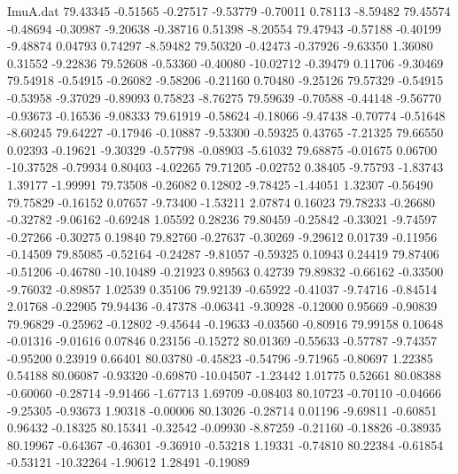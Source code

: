 \begin{filecontents}{ImuA.dat}
  79.43345   -0.51565   -0.27517   -9.53779   -0.70011    0.78113   -8.59482
  79.45574   -0.48694   -0.30987   -9.20638   -0.38716    0.51398   -8.20554
  79.47943   -0.57188   -0.40199   -9.48874    0.04793    0.74297   -8.59482
  79.50320   -0.42473   -0.37926   -9.63350    1.36080    0.31552   -9.22836
  79.52608   -0.53360   -0.40080  -10.02712   -0.39479    0.11706   -9.30469
  79.54918   -0.54915   -0.26082   -9.58206   -0.21160    0.70480   -9.25126
  79.57329   -0.54915   -0.53958   -9.37029   -0.89093    0.75823   -8.76275
  79.59639   -0.70588   -0.44148   -9.56770   -0.93673   -0.16536   -9.08333
  79.61919   -0.58624   -0.18066   -9.47438   -0.70774   -0.51648   -8.60245
  79.64227   -0.17946   -0.10887   -9.53300   -0.59325    0.43765   -7.21325
  79.66550    0.02393   -0.19621   -9.30329   -0.57798   -0.08903   -5.61032
  79.68875   -0.01675    0.06700  -10.37528   -0.79934    0.80403   -4.02265
  79.71205   -0.02752    0.38405   -9.75793   -1.83743    1.39177   -1.99991
  79.73508   -0.26082    0.12802   -9.78425   -1.44051    1.32307   -0.56490
  79.75829   -0.16152    0.07657   -9.73400   -1.53211    2.07874    0.16023
  79.78233   -0.26680   -0.32782   -9.06162   -0.69248    1.05592    0.28236
  79.80459   -0.25842   -0.33021   -9.74597   -0.27266   -0.30275    0.19840
  79.82760   -0.27637   -0.30269   -9.29612    0.01739   -0.11956   -0.14509
  79.85085   -0.52164   -0.24287   -9.81057   -0.59325    0.10943    0.24419
  79.87406   -0.51206   -0.46780  -10.10489   -0.21923    0.89563    0.42739
  79.89832   -0.66162   -0.33500   -9.76032   -0.89857    1.02539    0.35106
  79.92139   -0.65922   -0.41037   -9.74716   -0.84514    2.01768   -0.22905
  79.94436   -0.47378   -0.06341   -9.30928   -0.12000    0.95669   -0.90839
  79.96829   -0.25962   -0.12802   -9.45644   -0.19633   -0.03560   -0.80916
  79.99158    0.10648   -0.01316   -9.01616    0.07846    0.23156   -0.15272
  80.01369   -0.55633   -0.57787   -9.74357   -0.95200    0.23919    0.66401
  80.03780   -0.45823   -0.54796   -9.71965   -0.80697    1.22385    0.54188
  80.06087   -0.93320   -0.69870  -10.04507   -1.23442    1.01775    0.52661
  80.08388   -0.60060   -0.28714   -9.91466   -1.67713    1.69709   -0.08403
  80.10723   -0.70110   -0.04666   -9.25305   -0.93673    1.90318   -0.00006
  80.13026   -0.28714    0.01196   -9.69811   -0.60851    0.96432   -0.18325
  80.15341   -0.32542   -0.09930   -8.87259   -0.21160   -0.18826   -0.38935
  80.19967   -0.64367   -0.46301   -9.36910   -0.53218    1.19331   -0.74810
  80.22384   -0.61854   -0.53121  -10.32264   -1.90612    1.28491   -0.19089

\end{filecontents}
